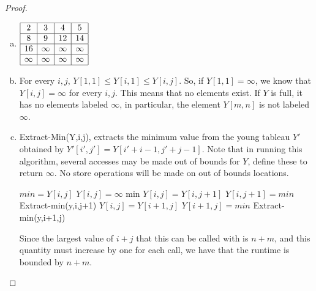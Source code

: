 \documentclass{article}
\begin{document}
\begin{proof}
\begin{enumerate}[a.]
\item
$
\begin{array}{|c|c|c|c|}
\hline
2&3&4&5\\
\hline
8&9&12&14\\
\hline
16&\infty&\infty&\infty\\
\hline
\infty&\infty&\infty&\infty\\
\hline
\end{array}
$

\item
For every $i,j$, $Y[1,1] \le Y[i,1] \le Y[i,j]$. So, if $Y[1,1] = \infty$, we know that $Y[i,j]=\infty$ for every $i,j$. This means that no elements exist. If $Y$ is full, it has no elements labeled $\infty$, in particular, the element $Y[m,n]$ is not labeled $\infty$.
\item
Extract-Min(Y,i,j), extracts the minimum value from the young tableau $Y'$ obtained by $Y'[i',j'] = Y[i'+i-1,j'+j-1]$. Note that in running this algorithm, several accesses may be made out of bounds for $Y$, define these to return $\infty$. No store operations will be made on out of bounds locations.
\begin{algorithm}
\begin{algorithmic}[1]
\State $min = Y[i,j]$
\State $Y[i,j] = \infty$
\State \Return min
\EndIf
{}
\State $Y[i,j] = Y[i,j+1]$
\State $Y[i,j+1] = min$
\State \Return Extract-min(y,i,j+1)
\Else
\State $Y[i,j] = Y[i+1,j]$
\State $Y[i+1,j] = min$
\State \Return Extract-min(y,i+1,j)
\EndIf
\end{algorithmic}
\end{algorithm}
Since the largest value of $i+j$ that this can be called with is $n+m$, and this quantity must increase by one for each call, we have that the runtime is bounded by $n+m$.


\end{enumerate}
\end{proof}
\end{document}
